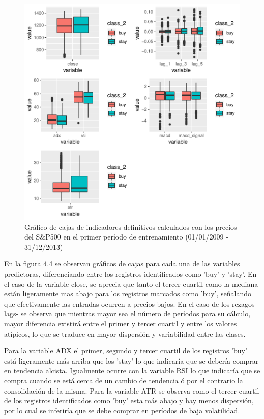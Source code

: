 \documentclass[a4paper,12pt]{Latex/Classes/PhDthesisPSnPDF}
\begin{document}
\begin{figure}[H]
\centering
\includegraphics{main-009}
\caption{Gráfico de cajas de indicadores definitivos calculados con los precios del S\&P500 en el primer período de entrenamiento (01/01/2009 - 31/12/2013)}
\end{figure}

En la figura 4.4 se observan gráficos de cajas para cada una de las variables predictoras, diferenciando entre los registros identificados como 'buy' y 'stay'. En el caso de la variable close, se aprecia que tanto el tercer cuartil como la mediana están ligeramente mas abajo para los registros marcados como 'buy', señalando que efectivamente las entradas ocurren a precios bajos. En el caso de los rezagos -lags- se observa que mientras mayor sea el número de períodos para su cálculo, mayor diferencia existirá entre el primer y tercer cuartil y entre los valores atípicos, lo que se traduce en mayor dispersión y variabilidad entre las clases.

Para la variable ADX el primer, segundo y tercer cuartil de los registros 'buy' está ligeramente más arriba que los 'stay' lo que indicaría que se debería comprar en tendencia alcista. Igualmente ocurre con la variable RSI lo que indicaría que se compra cuando se está cerca de un cambio de tendencia ó por el contrario la consolidación de la misma. Para la variable ATR se observa como el tercer cuartil de los registros identificados como 'buy' esta más abajo y hay menos dispersión, por lo cual se inferiría que se debe comprar en períodos de baja volatilidad.
\end{document}
